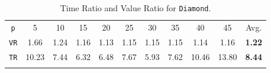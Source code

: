 \begin{table}[h]																	
 \centering
 \small
 \setlength{\tabcolsep}{4.0pt}
 \renewcommand \arraystretch{1.1}
\begin{tabular}{ccccccccccc}																					
\texttt{p}	&	5	&	10	&	15	&	20	&	25	&	30	&	35	&	40	&	45	&	Avg.	\\	
\cmidrule(lr){1-1} \cmidrule(lr){2-10} \cmidrule(lr){11-11}
\texttt{VR} &	1.66	&	1.24	&	1.16	&	1.13	&	1.15	&	1.15	&	1.15	&	1.14	&	1.16	&	\textbf{1.22}	\\	
\texttt{TR} &	10.23	&	7.44	&	6.32	&	6.48	&	7.67	&	5.93	&	7.62	&	10.46	&	13.80	&	\textbf{8.44}	\\	\\
\end{tabular}
\caption{Time Ratio and Value Ratio for \texttt{Diamond}.}														\label{tab:diamond}								
\end{table}																						






